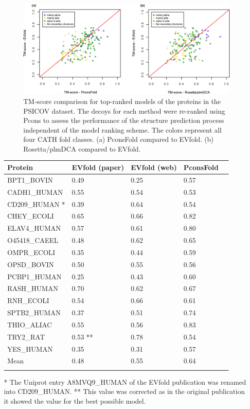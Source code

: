 \documentclass{bioinfo}
\begin{document}
\begin{figure}[!tpb]%
\centerline{\includegraphics[scale=0.7]{figures/vs.eps}}
\caption{TM-score comparison for top-ranked models of the proteins in
 the PSICOV dataset. The decoys for each method were re-ranked using
 Pcons to assess the performance of the structure prediction process
 independent of the model ranking scheme. The colors represent all
 four CATH fold classes. (a) PconsFold compared to EVfold. (b)
 Rosetta/plmDCA compared to EVfold.}\label{fig:vs}
\end{figure}

\begin{table}[!t]
{\begin{tabular}{lp{1.5cm}p{1.5cm}p{1.5cm}p{1.5cm}}\toprule
Protein & EVfold (paper) & EVfold (web)  & PconsFold\\\midrule
BPT1\_BOVIN & 0.49 & 0.25  & 0.57 \\
CADH1\_HUMAN & 0.55 & 0.54  & 0.53 \\
CD209\_HUMAN * & 0.39 & 0.64  & 0.54 \\
CHEY\_ECOLI & 0.65 & 0.66  & 0.82 \\
ELAV4\_HUMAN & 0.57 & 0.61  & 0.80 \\
O45418\_CAEEL & 0.48 & 0.62  & 0.65 \\
OMPR\_ECOLI & 0.35 & 0.44  & 0.59 \\
OPSD\_BOVIN & 0.50 & 0.55  & 0.56 \\
PCBP1\_HUMAN & 0.25 & 0.43  & 0.60 \\
RASH\_HUMAN & 0.70 & 0.62  & 0.67 \\
RNH\_ECOLI & 0.54 & 0.66  & 0.61 \\
SPTB2\_HUMAN & 0.37 & 0.51 & 0.74 \\
THIO\_ALIAC & 0.55 & 0.56  & 0.83 \\
TRY2\_RAT & 0.53 ** & 0.78  & 0.54 \\
YES\_HUMAN & 0.35 & 0.31  & 0.57 \\ \midrule
Mean & 0.48 & 0.55  & 0.64 \\ \botrule
\end{tabular}}{* The Uniprot entry A8MVQ9\_HUMAN of the EVfold publication was renamed into CD209\_HUMAN. ** This value was corrected as in the original publication it showed the value for the best possible model.}
\end{table}
\end{document}
